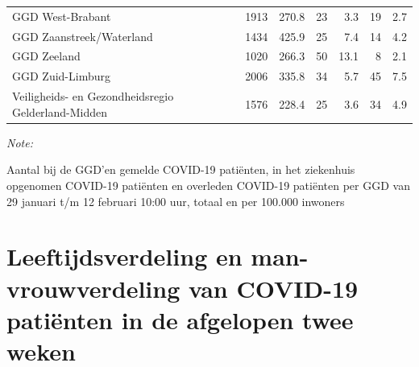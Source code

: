\documentclass[
  english,
  man,floatsintext]{apa6}
\begin{document}
\begin{table}[H]
\begin{threeparttable}
\begin{tabular}{lrrrrrr}
GGD West-Brabant & 1913 & 270.8 & 23 & 3.3 & 19 & 2.7\\
GGD Zaanstreek/Waterland & 1434 & 425.9 & 25 & 7.4 & 14 & 4.2\\
GGD Zeeland & 1020 & 266.3 & 50 & 13.1 & 8 & 2.1\\
GGD Zuid-Limburg & 2006 & 335.8 & 34 & 5.7 & 45 & 7.5\\
Veiligheids- en Gezondheidsregio Gelderland-Midden & 1576 & 228.4 & 25 & 3.6 & 34 & 4.9\\
\bottomrule
\end{tabular}
\begin{tablenotes}
\item \textit{Note: } 
\item Aantal bij de GGD’en gemelde COVID-19 patiënten, in het ziekenhuis opgenomen COVID-19 patiënten en overleden COVID-19 patiënten per GGD van 29 januari t/m 12 februari 10:00 uur, totaal en per 100.000 inwoners
\end{tablenotes}
\end{threeparttable}
\endgroup{}
\end{table}

\newpage

\hypertarget{leeftijdsverdeling-en-man-vrouwverdeling-van-covid-19-patiuxebnten-in-de-afgelopen-twee-weken}{%
\section{Leeftijdsverdeling en man-vrouwverdeling van COVID-19 patiënten in de afgelopen twee weken}\label{leeftijdsverdeling-en-man-vrouwverdeling-van-covid-19-patiuxebnten-in-de-afgelopen-twee-weken}}
\end{document}
